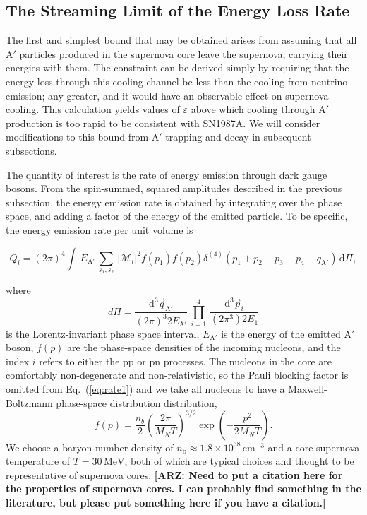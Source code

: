 \documentclass[nofootinbib,prd,superscriptaddress,twocolumn]{revtex4}
\newcommand{\beq}{\begin{equation}}
\newcommand{\eeq}{\end{equation}}
\newcommand{\qa}{q_{\mathrm{A}'}}
\newcommand{\Aprime}{\mathrm{A}'}
\newcommand{\dd}{\mathrm{d}}
\newcommand{\arz}[1]{{{\bf{\color{BrickRed}[ARZ: #1]}}}}
\begin{document}
\subsection{The Streaming Limit of the Energy Loss Rate}

The first and simplest bound that may be obtained arises from assuming that all $\Aprime$ particles produced in the supernova core 
leave the supernova, carrying their energies with them. The constraint can be derived simply by 
requiring that the energy loss through this cooling channel be less than the cooling from neutrino emission; 
any greater, and it would have an observable effect on supernova cooling. This calculation yields values of 
$\varepsilon$ above which cooling through $\Aprime$ production is too rapid to be consistent with SN1987A. 
We will consider modifications to this bound from $\Aprime$ trapping and decay in subsequent subsections.

The quantity of interest is the rate of energy emission through dark gauge bosons. 
From the spin-summed, squared amplitudes described in the previous subsection, 
the energy emission rate is obtained by integrating over the phase space, 
and adding a factor of the energy of the emitted particle. To be specific, the 
energy emission rate per unit volume is 
%
\begin{widetext}
\beq
\label{eq:rate1}
Q_i = (2\pi)^4 \int\, E_{\mathrm{A}'} \, \sum_{s_1,s_2}\, \vert \mathcal{M}_i \vert^2 f(p_1) f(p_2)\delta^{(4)}(p_1+p_2-p_3-p_4-\qa)\, \dd \Pi,
\eeq
\end{widetext}
%
where 
%
\begin{equation}
d\Pi = \frac{\dd^3 \vec{q}_{\mathrm{A}'}}{(2\pi)^3 2E_{\mathrm{A}'}}\, \prod_{i=1}^{4}\, \frac{\dd^3 \vec{p}_i}{(2\pi^3) 2E_1}
\end{equation} 
is the Lorentz-invariant phase space interval, 
$ E_{\mathrm{A}'}$ is the energy of the emitted $\Aprime$ boson, 
$f(p)$ are the phase-space densities of the incoming nucleons, and 
the index $i$ refers to either the pp or pn processes. 
The nucleons in the core are comfortably non-degenerate and non-relativistic, 
so the Pauli blocking factor is omitted from Eq.~(\ref{eq:rate1}) and we take 
all nucleons to have a Maxwell-Boltzmann phase-space distribution distribution, 
\beq
f(p) =  \frac{n_b}{2} \left( \frac{2 \pi}{M_N T} \right)^{3/2} \exp \left(-\frac{p^2}{2 M_N T} \right).
\eeq
%
We choose a baryon number density of $n_{\mathrm{b}} \approx 1.8 \times 10^{38}\, \mathrm{cm}^{-3}$ and a 
core supernova temperature of $T = 30\, \mathrm{MeV}$, both of which are typical choices and thought to 
be representative of supernova cores. \arz{Need to put a citation here for the properties of supernova cores. 
I can probably find something in the literature, but please put something here if you have a citation.}
\end{document}

